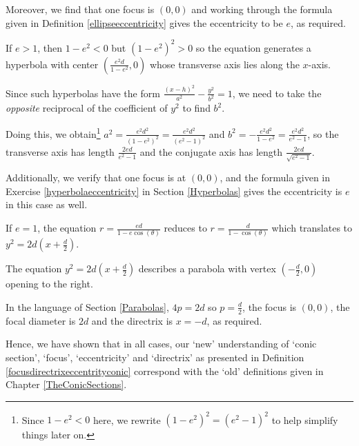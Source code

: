 \smallskip

Moreover, we find that one focus is $(0,0)$ and working through the formula given in  Definition \ref{ellipseeccentricity} gives the eccentricity to be $e$, as required. 

\smallskip

 If $e > 1$, then $1 - e^2 < 0$ but $(1-e^2)^2 > 0$ so the equation generates a hyperbola with center $\left(\frac{e^2 d}{1-e^2}, 0\right)$ whose transverse axis lies along the $x$-axis.  
 
 \smallskip
 
 Since such hyperbolas have the form $\frac{(x-h)^2}{a^2} -\frac{y^2}{b^2} = 1$, we need to take the \textit{opposite} reciprocal of the coefficient of $y^2$ to find $b^2$. 
 
 \smallskip
 
Doing this, we obtain\footnote{ Since $1 - e^2 < 0$ here, we rewrite $\left(1-e^2\right)^2 = \left(e^2-1\right)^2$ to help simplify things later on.}  $a^2 = \frac{e^2 d^2}{\left(1-e^2\right)^2} = \frac{e^2d^2}{\left(e^2-1\right)^2}$ and  $b^2 = -\frac{e^2 d^2}{1-e^2} = \frac{e^2d^2}{e^2-1}$, so the transverse axis has length  $\frac{2ed}{e^2-1}$ and the conjugate axis has length $\frac{2ed}{\sqrt{e^2-1}}$.  
 
 \smallskip
 
 Additionally, we verify that one focus is at $(0,0)$, and the formula given in Exercise \ref{hyperbolaeccentricity} in Section \ref{Hyperbolas} gives  the eccentricity is $e$ in this case as well. 
 
 \smallskip
 
 If $e=1$, the equation $r = \frac{ed}{1-e\cos(\theta)}$ reduces to $r = \frac{d}{1-\cos(\theta)}$ which translates to $y^2 = 2d\left(x + \frac{d}{2}\right)$.   
 
 \smallskip
 
The equation $y^2 = 2d\left(x + \frac{d}{2}\right)$ describes a parabola with vertex $\left(-\frac{d}{2}, 0\right)$ opening to the right.  

\smallskip

In the language of Section \ref{Parabolas}, $4p = 2d$ so $p = \frac{d}{2}$, the focus is $(0,0)$, the focal diameter is $2d$ and the directrix is $x = -d$, as required. 

\smallskip

 Hence, we have shown that in all cases, our `new' understanding  of `conic section', `focus', `eccentricity' and `directrix' as presented in Definition \ref{focusdirectrixeccentrityconic} correspond with the `old' definitions given in Chapter \ref{TheConicSections}. 
 
